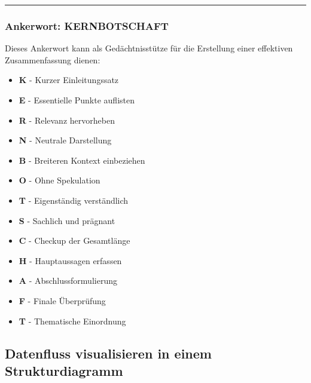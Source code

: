 \documentclass{vorlage-design-main}
\begin{document}
\begin{center}\rule{0.5\linewidth}{0.5pt}\end{center}

\subsubsection{Ankerwort: KERNBOTSCHAFT}\label{ankerwort-kernbotschaft}

Dieses Ankerwort kann als Gedächtnisstütze für die Erstellung einer
effektiven Zusammenfassung dienen:

\begin{itemize}

\item
  \textbf{K} - Kurzer Einleitungssatz
\item
  \textbf{E} - Essentielle Punkte auflisten
\item
  \textbf{R} - Relevanz hervorheben
\item
  \textbf{N} - Neutrale Darstellung
\item
  \textbf{B} - Breiteren Kontext einbeziehen
\item
  \textbf{O} - Ohne Spekulation
\item
  \textbf{T} - Eigenständig verständlich
\item
  \textbf{S} - Sachlich und prägnant
\item
  \textbf{C} - Checkup der Gesamtlänge
\item
  \textbf{H} - Hauptaussagen erfassen
\item
  \textbf{A} - Abschlussformulierung
\item
  \textbf{F} - Finale Überprüfung
\item
  \textbf{T} - Thematische Einordnung
\end{itemize}

\subsection{Datenfluss visualisieren in einem
Strukturdiagramm}\label{datenfluss-visualisieren-in-einem-strukturdiagramm}
\end{document}
